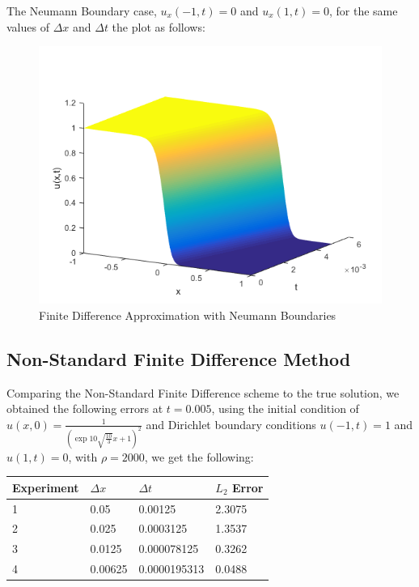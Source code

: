 \documentclass[a4paper]{article}
\begin{document}
    The Neumann Boundary case, $u_{x}(-1,t) = 0$ and $u_{x}(1,t) = 0$, for the same values of $\Delta x$ and $\Delta t$ the plot as follows:
    \begin{figure}[H]
    \caption{Finite Difference Approximation with Neumann Boundaries}
    \includegraphics[scale=0.7]{Fisher_Neumann_FiniteDifference.png}
    \end{figure}
    \newpage
	\subsection{Non-Standard Finite Difference Method}
    	Comparing the Non-Standard Finite Difference scheme to the true solution, we obtained the following errors at $t=0.005$, using the initial condition of $u(x,0)=\frac{1}{(\exp{10\sqrt{\frac{10}{3}}x}+1)^2}$ and Dirichlet boundary conditions $u(-1, t) = 1$ and $u(1, t) = 0$, with $\rho =2000$, we get the following:
    	
    	\begin{table}[H]
            \begin{tabular}{|l|l|l|l|}
            \hline
            Experiment & $\Delta x$ & $\Delta t$   & $L_2$ Error \\ \hline
            1          & 0.05       & 0.00125      & 2.3075\\ \hline
            2          & 0.025      & 0.0003125    & 1.3537\\ \hline
            3          & 0.0125     & 0.000078125  & 0.3262\\ \hline
            4          & 0.00625    & 0.0000195313 & 0.0488\\ \hline
            \end{tabular}
        \end{table}
	
\end{document}
